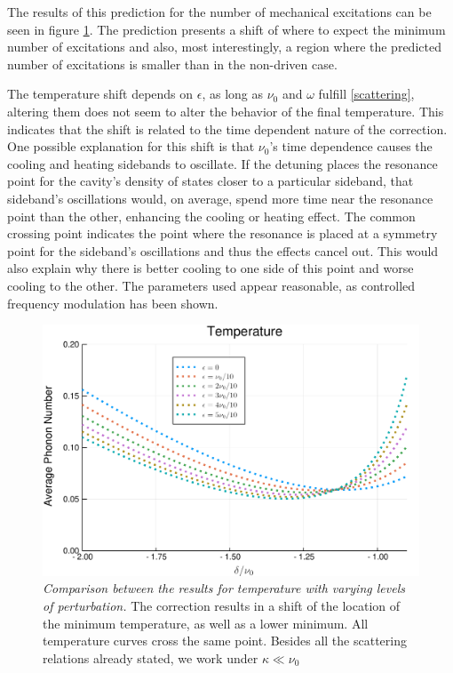 \documentclass[reprint, amsmath,amssymb, aps,pra]{revtex4-1}
\begin{document}
The results of this prediction for the number of mechanical
excitations can be seen in figure \ref{GraficaTemp}. The prediction
presents a shift of where to expect the minimum number of excitations
and also, most interestingly, a region where the predicted number of
excitations is smaller than in the non-driven case.

The temperature shift depends on $\epsilon$, as long as $\nu_0$ and $\omega$ fulfill \eqref{scattering}, altering them does not seem to alter the behavior of the final temperature. This indicates that the shift is related to the time dependent nature of the correction. One possible explanation for this shift is that $\nu_0$'s time dependence causes the cooling and heating sidebands to oscillate. If the detuning places the resonance point for the cavity's density of states closer to a particular sideband, that sideband's oscillations would, on average, spend more time near the resonance point than the other, enhancing the cooling or heating effect.  The common crossing point indicates the point where the resonance is placed at a symmetry point for the sideband's oscillations and thus the effects cancel out. This would also explain why there is better cooling to one side of this point and worse cooling to the other. The parameters used appear reasonable, as controlled frequency modulation has been shown\cite{WoolleyNM}\cite{JockelS}.



\begin{figure}
\includegraphics[scale=.4]{Temperature.pdf}  
\caption{\textit{Comparison between the results for temperature with
    varying levels of perturbation.} The correction results in a
  shift of the location of the minimum temperature, as well as a lower
  minimum. All temperature curves cross the same point. Besides all the scattering relations already stated, we
  work under $\kappa \ll \nu_0$}
\label{GraficaTemp}
\end{figure}
\end{document}
